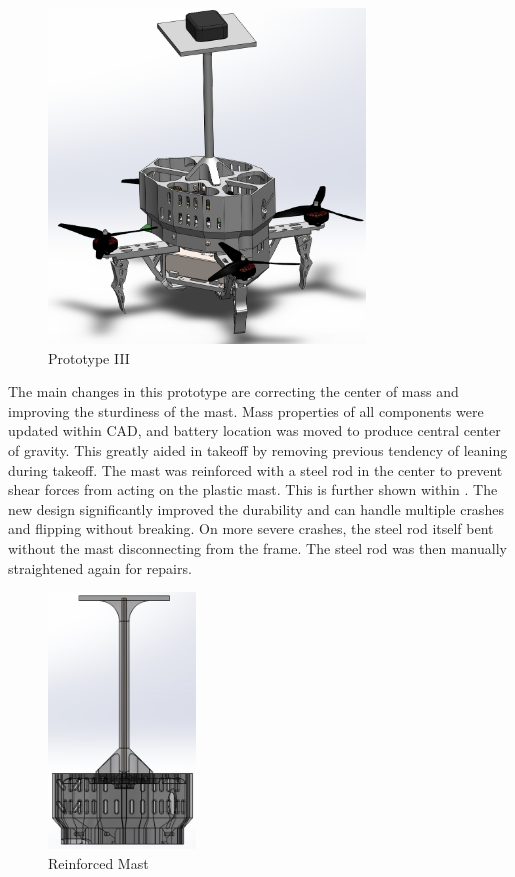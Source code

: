 \documentclass{article}
\begin{document}
\begin{figure}[h!]
  \begin{center} 
  \caption{Prototype III}
  \label{fig:PrototypeIII}
        \includegraphics[width=0.75\textwidth]{Reflection/PrototypeIII.png}
  \end{center}
\end{figure}

The main changes in this prototype are correcting the center of mass and improving the sturdiness of the mast. Mass properties of all components were updated within CAD, and battery location was moved to produce central center of gravity. This greatly aided in takeoff by removing previous tendency of leaning during takeoff. The mast was reinforced with a steel rod in the center to prevent shear forces from acting on the plastic mast. This is further shown within . The new design significantly improved the durability and can handle multiple crashes and flipping without breaking. On more severe crashes, the steel rod itself bent without the mast disconnecting from the frame. The steel rod was then manually straightened again for repairs.

\begin{figure}[h!]
  \begin{center} 
  \caption{Reinforced Mast}
  \label{fig:mastSupport}
        \includegraphics[width=0.35\textwidth]{Reflection/ReinforcedMast.png}
  \end{center}
\end{figure}
\end{document}

